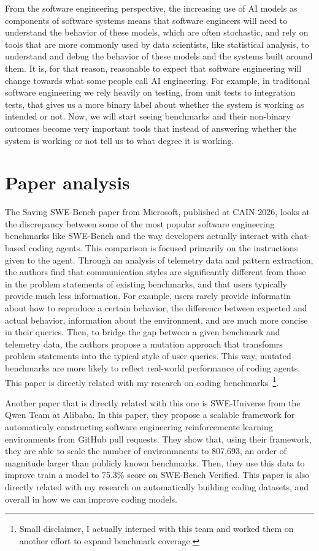\documentclass[11pt,a4paper]{article}
\begin{document}
From the software engineering perspective, the increasing use of AI models as components of software systems means that software engineers will need to understand the behavior of these models, which are often stochastic, and rely on tools that are more commonly used by data scientists, like statistical analysis, to understand and debug the behavior of these models and the systems built around them.
It is, for that reason, reasonable to expect that software engineering will change towards what some people call AI engineering.
For example, in traditonal software engineering we rely heavily on testing, from unit tests to integration tests, that gives us a more binary label about whether the system is working as intended or not.
Now, we will start seeing benchmarks and their non-binary outcomes become very important tools that instead of answering whether the system is working or not tell us to what degree it is working.

\section{Paper analysis}

The Saving SWE-Bench paper \cite{garg2025saving} from Microsoft, published at CAIN 2026, looks at the discrepancy between some of the most popular software engineering benchmarks like SWE-Bench \cite{jimenez2024swe} and the way developers actually interact with chat-based coding agents.
This comparison is focused primarily on the instructions given to the agent. Through an analysis of telemetry data and pattern extraction, the authors find that communication styles are significantly different from those in the problem statements of existing benchmarks, and that users typically provide much less information.
For example, users rarely provide informatin about how to reproduce a certain behavior, the difference between expected and actual behavior, information about the environment, and are much more concise in their queries.
Then, to bridge the gap between a given benchmark and telemetry data, the authors propose a mutation approach that transfomrs problem statements into the typical style of user queries.
This way, mutated benchmarks are more likely to reflect real-world performance of coding agents.
This paper is directly related with my research on coding benchmarks~\footnote{Small disclaimer, I actually interned with this team and worked them on another effort to expand benchmark coverage.}.

Another paper that is directly related with this one is SWE-Universe \cite{chen2026swe} from the Qwen Team at Alibaba.
In this paper, they propose a scalable framework for automaticaly constructing software engineering reinforcemente learning environments from GitHub pull requests.
They show that, using their framework, they are able to scale the number of environmnents to 807,693, an order of magnitude larger than publicly known benchmarks.
Then, they use this data to improve train a model to 75.3\% score on SWE-Bench Verified.
This paper is also directly related with my research on automatically building coding datasets, and overall in how we can improve coding models.
\end{document}
